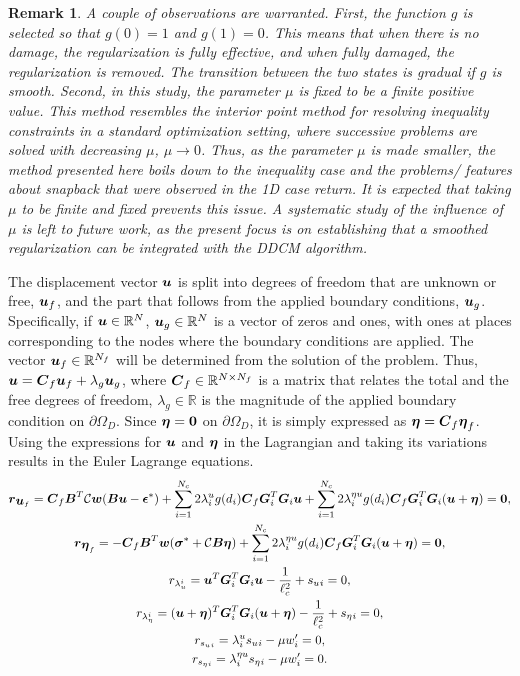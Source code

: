 \documentclass[10pt,review]{cas-sc}
\newtheorem*{remark}{Remark}
\begin{document}
\begin{remark}
	A couple of observations are warranted. First, the function $g$ is selected so that $g(0)=1$ and $g(1)=0$. This means that when there is no damage, the regularization is fully effective, and when fully damaged, the regularization is removed. The transition between the two states is gradual if $g$ is smooth. Second, in this study, the parameter $\mu$ is fixed to be a finite positive value. This method resembles the interior point method for resolving inequality constraints in a standard optimization setting, where successive problems are solved with decreasing $\mu$, $\mu \to 0$. Thus, as the parameter $\mu$ is made smaller, the method presented here boils down to the inequality case and the problems/ features about snapback that were observed in the 1D case return. It is expected that taking $\mu$ to be finite and fixed prevents this issue. A systematic study of the influence of $\mu$ is left to future work, as the present focus is on establishing that a smoothed regularization can be integrated with the DDCM algorithm.
\end{remark}
The displacement vector $\mbox{\boldmath $u$}$ is split into degrees of freedom that are unknown or free, $\mbox{\boldmath $u$}_f$, and the part that follows from the applied boundary conditions, $\mbox{\boldmath $u$}_g$. Specifically, if $\mbox{\boldmath $u$} \in \mathbb{R}^N$, $\mbox{\boldmath $u$}_g \in \mathbb{R}^N$ is a vector of zeros and ones, with ones at places corresponding to the nodes where the boundary conditions are applied. The vector $\mbox{\boldmath $u$}_f \in \mathbb{R}^{N_f}$ will be determined from the solution of the problem. Thus, $\mbox{\boldmath $u$} = \mbox{\boldmath $C$}_f \mbox{\boldmath $u$}_f + \lambda_g \mbox{\boldmath $u$}_g$, where $\mbox{\boldmath $C$}_f \in \mathbb{R}^{N \times N_f} $ is a matrix that relates the total and the free degrees of freedom, $\lambda_g \in \mathbb{R}$ is the magnitude of the applied boundary condition on $\partial \Omega_D$. Since $\mbox{\boldmath $\eta$} = \bf0$ on $\partial \Omega_D$, it is simply expressed as $\mbox{\boldmath $\eta$} = \mbox{\boldmath $C$}_f \mbox{\boldmath $\eta$}_f$. Using the expressions for $\mbox{\boldmath $u$}$ and $\mbox{\boldmath $\eta$}$ in the Lagrangian and taking its variations results in the  Euler Lagrange equations.
\begin{gather}
	\mbox{\boldmath $r$}_{\mbox{\boldmath $u$}_f} = \mbox{\boldmath $C$}_f \mbox{\boldmath $B$}^T \mathcal{C} \mbox{\boldmath $w$}(\mbox{\boldmath $B$} \mbox{\boldmath $u$} - \mbox{\boldmath $\epsilon$}^*) + \sum_{i=1}^{N_c} 2 \lambda^u_i  g(d_i) \mbox{\boldmath $C$}_f \mbox{\boldmath $G$}_i ^T \mbox{\boldmath $G$}_i \mbox{\boldmath $u$} 
	+\sum_{i=1}^{N_c} 2 \lambda^{\eta u}_i  g(d_i) \mbox{\boldmath $C$}_f \mbox{\boldmath $G$}_i ^T \mbox{\boldmath $G$}_i (\mbox{\boldmath $u$}+\mbox{\boldmath $\eta$}) = \bf0, \label{all_equations_first_one} \\
	\mbox{\boldmath $r$}_{\mbox{\boldmath $\eta$}_f} = -\mbox{\boldmath $C$}_f \mbox{\boldmath $B$}^T \mbox{\boldmath $w$}(\mbox{\boldmath $\sigma$}^*+ \mathcal{C} \mbox{\boldmath $B$} \mbox{\boldmath $\eta$} ) 
	+\sum_{i=1}^{N_c} 2 \lambda^{\eta u}_i  g(d_i) \mbox{\boldmath $C$}_f \mbox{\boldmath $G$}_i ^T \mbox{\boldmath $G$}_i (\mbox{\boldmath $u$}+\mbox{\boldmath $\eta$}) = \bf0, \\
	r_{\lambda_u^ i} = \mbox{\boldmath $u$} ^T \mbox{\boldmath $G$}_i ^T \mbox{\boldmath $G$}_i \mbox{\boldmath $u$} - \frac{1}{\ell_c ^2} +  s_u{_i} = 0, \\
	r_{\lambda_\eta^ i} = (\mbox{\boldmath $u$}+\mbox{\boldmath $\eta$}) ^T \mbox{\boldmath $G$}_i ^T \mbox{\boldmath $G$}_i (\mbox{\boldmath $u$}+\mbox{\boldmath $\eta$}) - \frac{1}{\ell_c ^2} +  s_\eta{_i} = 0, \\ 
	r_{s_u{_i}} = \lambda^u_i s_u{_i} - \mu w_i'   = 0, \\
	r_{s_\eta{_i}} = \lambda^{\eta u}_i s_\eta{_i} - \mu w_i'   = 0.\label{all_equations_last_one} 
\end{gather}
\end{document}

